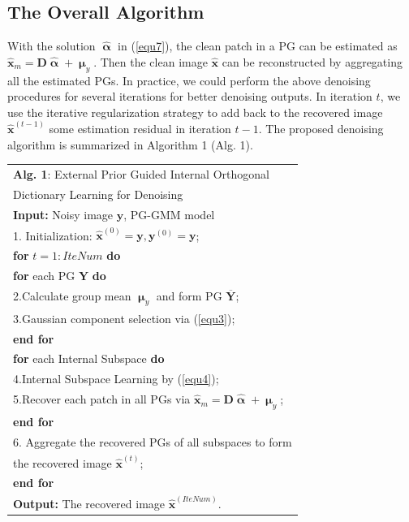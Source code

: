 \documentclass[10pt,twocolumn,letterpaper]{article}
\begin{document}

\subsection{The Overall Algorithm}
With the solution $\hat{\boldsymbol{\upalpha}}$ in (\ref{equ7}), the clean patch in a PG can be estimated as $\hat{\mathbf{x}}_{m}=\mathbf{D}\hat{\boldsymbol{\upalpha}}+\boldsymbol{\upmu}_{y}$. Then the clean image $\hat{\mathbf{x}}$ can be reconstructed by aggregating all the estimated PGs. In practice, we could perform the above denoising procedures for several iterations for better denoising outputs. In iteration $t$, we use the iterative regularization strategy \cite{osher2005iterative} to add back to the recovered image $\hat{\mathbf{x}}^{(t-1)}$ some estimation residual in iteration $t-1$. The proposed denoising algorithm is summarized in Algorithm 1 (Alg. 1).
\begin{table}
\label{alg1}
\begin{tabular}{l}
\hline
\textbf{Alg. 1}: External Prior Guided Internal Orthogonal 
\\
\quad \quad \quad Dictionary Learning for Denoising
\\
\hline
\textbf{Input:} Noisy image $\mathbf{y}$, PG-GMM model
\\
1. Initialization: $\hat{\mathbf{x}}^{(0)}=\mathbf{y},\mathbf{y}^{(0)}=\mathbf{y}$;
\\
\textbf{for} $t = 1:IteNum$ \textbf{do}
\\
\quad\textbf{for} each PG $\mathbf{Y}$ \textbf{do}
\\
2.\quad Calculate group mean $\boldsymbol{\upmu}_{y}$ and form PG $\mathbf{\overline{Y}}$;
\\
3.\quad Gaussian component selection via (\ref{equ3});
\\
\quad\textbf{end for}
\\
\quad\textbf{for} each Internal Subspace \textbf{do}
\\
4.\quad Internal Subspace Learning by (\ref{equ4});
\\
5.\quad Recover each patch in all PGs via $\hat{\mathbf{x}}_{m}=\mathbf{D}\hat{\boldsymbol{\upalpha}}+\boldsymbol{\upmu}_{y}$;
\\
\quad\textbf{end for}
\\
6. Aggregate the recovered PGs of all subspaces to form
\\
\quad the recovered image $\hat{\mathbf{x}}^{(t)}$;
\\
\textbf{end for}
\\
\textbf{Output:} The recovered image $\hat{\mathbf{x}}^{(IteNum)}$.\\
\hline
\end{tabular}
\end{table}
\end{document}

